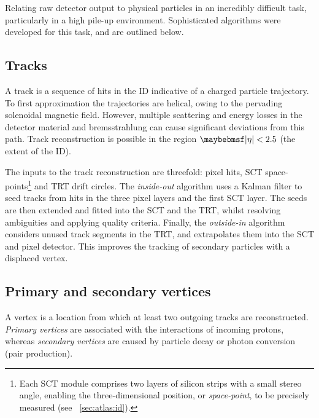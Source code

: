 
Relating raw detector output to physical particles in an incredibly difficult task,
particularly in a high pile-up environment. Sophisticated algorithms were developed for 
this task, and are outlined below.



\subsection{Tracks}
\label{sec:objects:tracks}

A track is a sequence of hits in the \ac{ID} indicative of a charged particle trajectory. 
To first approximation the trajectories are helical, owing to the pervading solenoidal 
magnetic field. However, multiple scattering and energy losses in the detector material 
and bremsstrahlung can cause significant deviations from this path. Track reconstruction 
is possible in the region $\mods{\eta} < 2.5$ (the extent of the \ac{ID}).

The inputs to the track reconstruction are threefold: pixel hits, \acs{SCT} 
space-points\footnote{
	Each SCT module comprises two layers of silicon strips with a small stereo angle, 
	enabling the three-dimensional position, or \textit{space-point}, to be precisely 
	measured (see \Section~\ref{sec:atlas:id}).
}
and \acs{TRT} drift circles. The \textit{inside-out} algorithm 
\cite{Tracking,ATLAS:ExpectPerf} uses a Kalman filter to seed tracks from hits in the 
three pixel layers and the first \acs{SCT} layer. The seeds are then extended and fitted 
into the \acs{SCT} and the \acs{TRT}, whilst resolving ambiguities and applying 
quality criteria. Finally, the \textit{outside-in} algorithm \cite{Tracking} considers 
unused track segments in the \acs{TRT}, and extrapolates them into the \acs{SCT} and 
pixel detector. This improves the tracking of secondary particles with a displaced vertex.



\subsection{Primary and secondary vertices}
\label{sec:objects:vertices}

A vertex is a location from which at least two outgoing tracks are reconstructed. 
\textit{Primary vertices} are associated with the interactions of incoming protons, 
whereas \textit{secondary vertices} are caused by particle decay or photon conversion
(\epluseminus pair production).

